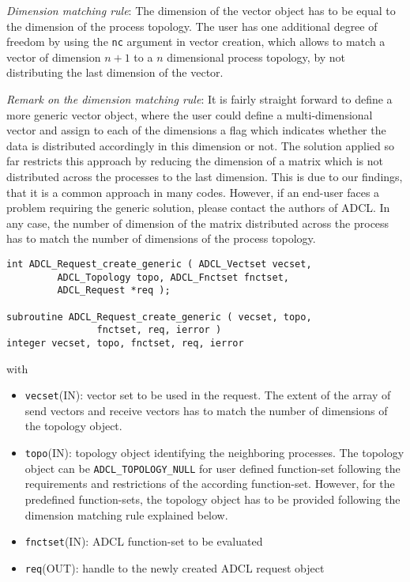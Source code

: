 {\it Dimension matching rule}: The dimension of the vector object has to be
equal to the dimension of the process topology. The user has one additional
degree of freedom by using the {\tt nc} argument in vector creation, which
allows to match a vector of dimension $n+1$ to a $n$ dimensional process
topology, by not distributing the last dimension of the vector.

{\it Remark on the dimension matching rule}: It is fairly straight forward to
define a more generic vector object, where the user could define a
multi-dimensional vector and assign to each of the dimensions a flag which
indicates whether the data is distributed accordingly in this dimension or not.
The solution applied so far restricts this approach by reducing the dimension
of a matrix which is not distributed across the processes to the last
dimension. This is due to our findings, that it is a common approach in
many codes. However, if an end-user faces a problem requiring the generic
solution, please contact the authors of ADCL. In any case, the number of
dimension of the matrix distributed across the process has to match the number
of dimensions of the process topology.

\begin{verbatim}
int ADCL_Request_create_generic ( ADCL_Vectset vecset, 
         ADCL_Topology topo, ADCL_Fnctset fnctset, 
         ADCL_Request *req );
      
subroutine ADCL_Request_create_generic ( vecset, topo, 
                fnctset, req, ierror )
integer vecset, topo, fnctset, req, ierror
\end{verbatim}
with
\begin{itemize}
\item {\tt vecset}(IN): vector set to be used in the request. The extent of
  the array of send vectors and receive vectors has to match the number of
  dimensions of the topology object.
\item {\tt topo}(IN): topology object identifying the neighboring processes.
  The topology object can be {\tt ADCL\_TOPOLOGY\_NULL} for user defined
  function-set following the requirements and restrictions of the according
  function-set. However, for the predefined function-sets, the topology object
  has to be provided following the dimension matching rule explained below.
\item {\tt fnctset}(IN): ADCL function-set to be evaluated
\item {\tt req}(OUT): handle to the newly created ADCL request object
\end{itemize}
\hspace{1cm}

